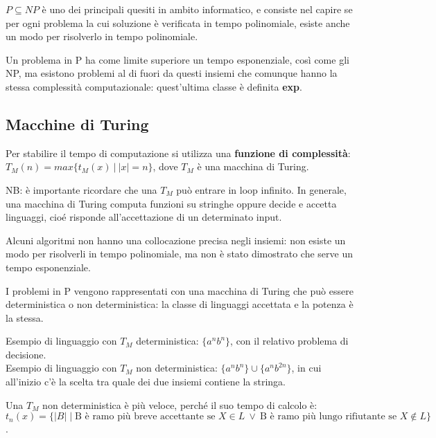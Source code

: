 $P \subseteq NP$ è uno dei principali quesiti in ambito informatico, e consiste nel capire se per ogni problema la cui soluzione è verificata in tempo polinomiale, esiste anche un modo per risolverlo in tempo polinomiale. 

Un problema in P ha come limite superiore un tempo esponenziale, così come gli NP, ma esistono problemi al di fuori da questi insiemi che comunque hanno la stessa complessità computazionale: quest'ultima classe è definita \textbf{exp}.

\subsection{Macchine di Turing}
Per stabilire il tempo di computazione si utilizza una \textbf{funzione di complessità}: \\
$T_M(n) = max\{t_M(x)\ |\ |x| = n\}$, dove $T_M$ è una macchina di Turing.

NB: è importante ricordare che una $T_M$ può entrare in loop infinito. In generale, una macchina di Turing computa funzioni su stringhe oppure decide e accetta linguaggi, cioé risponde all'accettazione di un determinato input.

Alcuni algoritmi non hanno una collocazione precisa negli insiemi: non esiste un modo per risolverli in tempo polinomiale, ma non è stato dimostrato che serve un tempo esponenziale. 

I problemi in P vengono rappresentati con una macchina di Turing che può essere deterministica o non deterministica: la classe di linguaggi accettata e la potenza è la stessa.

Esempio di linguaggio con $T_M$ deterministica: $\{a^nb^n\}$, con il relativo problema di decisione. \\
Esempio di linguaggio con $T_M$ non deterministica: $\{a^nb^n\} \cup \{a^nb^{2n}\}$, in cui all'inizio c'è la scelta tra quale dei due insiemi contiene la stringa. 

Una $T_M$ non deterministica è più veloce, perché il suo tempo di calcolo è: \\
$t_n(x) = \{|B| \mid \text{B è ramo più breve accettante se } X \in L\ \lor\ \text{B è ramo più lungo rifiutante se } X \notin L\}$.







